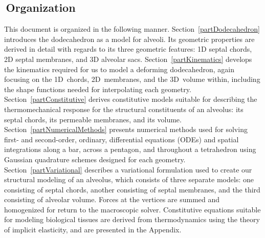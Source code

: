 \subsection{$\,$Organization}

This document is organized in the following manner.  Section~\ref{partDodecahedron} introduces the dodecahedron as a model for alveoli.  Its geometric properties are derived in detail with regards to its three geometric features: 1D septal chords, 2D septal membranes, and 3D alveolar sacs.  Section~\ref{partKinematics} develops the kinematics required for us to model a deforming dodecahedron, again focusing on the 1D~chords, 2D~membranes, and the 3D~volume within, including the shape functions needed for interpolating each geometry.  Section~\ref{partConstitutive} derives constitutive models suitable for describing the thermomechanical response for the structural constituents of an alveolus: its septal chords, its permeable membranes, and its volume.  Section~\ref{partNumericalMethods} presents numerical methods used for solving first- and second-order, ordinary, differential equations (ODEs) and spatial integrations along a bar, across a pentagon, and throughout a tetrahedron using Gaussian quadrature schemes designed for each geometry.  Section~\ref{partVariational} describes a variational formulation used to create our structural modeling of an alveolus, which consists of three separate models: one consisting of septal chords, another consisting of septal membranes, and the third consisting of alveolar volume.  Forces at the vertices are summed and homogenized for return to the macroscopic solver.  Constitutive equations suitable for modeling biological tissues are derived from thermo\-dynamics using the theory of implicit elasticity, and are presented in the Appendix.
